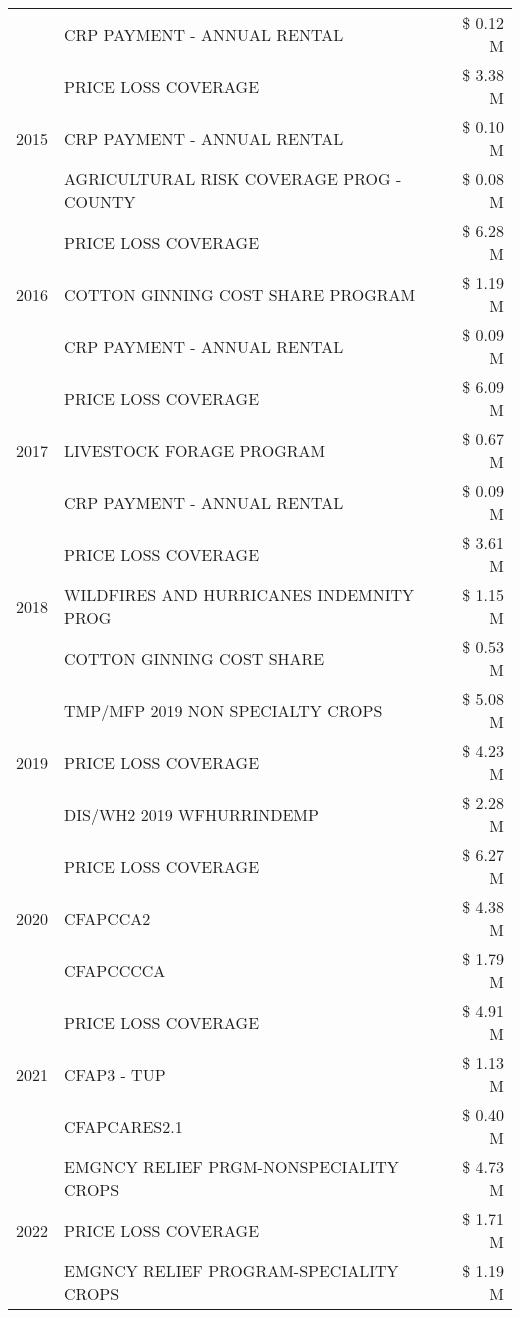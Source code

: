 \begin{tabular}{llr}
 & CRP PAYMENT - ANNUAL RENTAL & \$ 0.12 M \\
\cline{1-3}
\multirow[t]{3}{*}{2015} & PRICE LOSS COVERAGE & \$ 3.38 M \\
 & CRP PAYMENT - ANNUAL RENTAL & \$ 0.10 M \\
 & AGRICULTURAL RISK COVERAGE PROG - COUNTY & \$ 0.08 M \\
\cline{1-3}
\multirow[t]{3}{*}{2016} & PRICE LOSS COVERAGE & \$ 6.28 M \\
 & COTTON GINNING COST SHARE PROGRAM & \$ 1.19 M \\
 & CRP PAYMENT - ANNUAL RENTAL & \$ 0.09 M \\
\cline{1-3}
\multirow[t]{3}{*}{2017} & PRICE LOSS COVERAGE & \$ 6.09 M \\
 & LIVESTOCK FORAGE PROGRAM & \$ 0.67 M \\
 & CRP PAYMENT - ANNUAL RENTAL & \$ 0.09 M \\
\cline{1-3}
\multirow[t]{3}{*}{2018} & PRICE LOSS COVERAGE & \$ 3.61 M \\
 & WILDFIRES AND HURRICANES INDEMNITY PROG & \$ 1.15 M \\
 & COTTON GINNING COST SHARE & \$ 0.53 M \\
\cline{1-3}
\multirow[t]{3}{*}{2019} & TMP/MFP 2019 NON SPECIALTY CROPS & \$ 5.08 M \\
 & PRICE LOSS COVERAGE & \$ 4.23 M \\
 & DIS/WH2 2019 WFHURRINDEMP & \$ 2.28 M \\
\cline{1-3}
\multirow[t]{3}{*}{2020} & PRICE LOSS COVERAGE & \$ 6.27 M \\
 & CFAPCCA2 & \$ 4.38 M \\
 & CFAPCCCCA & \$ 1.79 M \\
\cline{1-3}
\multirow[t]{3}{*}{2021} & PRICE LOSS COVERAGE & \$ 4.91 M \\
 & CFAP3 - TUP & \$ 1.13 M \\
 & CFAPCARES2.1 & \$ 0.40 M \\
\cline{1-3}
\multirow[t]{3}{*}{2022} & EMGNCY RELIEF PRGM-NONSPECIALITY CROPS & \$ 4.73 M \\
 & PRICE LOSS COVERAGE & \$ 1.71 M \\
 & EMGNCY RELIEF PROGRAM-SPECIALITY CROPS & \$ 1.19 M \\
\cline{1-3}
\bottomrule
\end{tabular}
